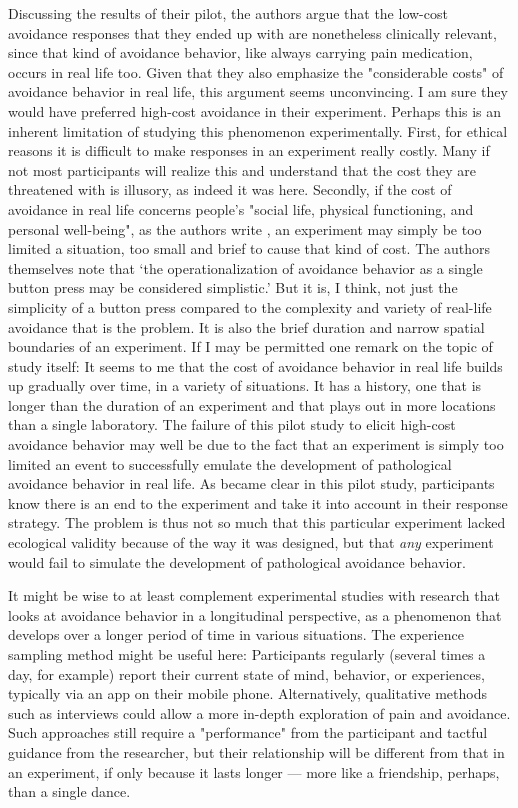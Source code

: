\documentclass[twocolumn, serif, authordate, reflection]{jote-article}
\begin{document}
Discussing the results of their pilot, the authors argue that the low-cost avoidance responses that they ended up with are nonetheless clinically relevant, since that kind of avoidance behavior, like always carrying pain medication, occurs in real life too. Given that they also emphasize the "considerable costs" \parencite[p.34]{Traxler2020} of avoidance behavior in real life, this argument seems unconvincing. I am sure they would have preferred high-cost avoidance in their experiment. Perhaps this is an inherent limitation of studying this phenomenon experimentally. First, for ethical reasons it is difficult to make responses in an experiment really costly. Many if not most participants will realize this and understand that the cost they are threatened with is illusory, as indeed it was here. Secondly, if the cost of avoidance in real life concerns people's "social life, physical functioning, and personal well-being", as the authors write \parencite[p.34]{Traxler2020}, an experiment may simply be too limited a situation, too small and brief to cause that kind of cost. The authors themselves note that `the operationalization of avoidance behavior as a single button press may be considered simplistic.' \parencite[p.34]{Traxler2020} But it is, I think, not just the simplicity of a button press compared to the complexity and variety of real-life avoidance that is the problem. It is also the brief duration and narrow spatial boundaries of an experiment. If I may be permitted one remark on the topic of study itself: It seems to me that the cost of avoidance behavior in real life builds up gradually over time, in a variety of situations. It has a history, one that is longer than the duration of an experiment and that plays out in more locations than a single laboratory. The failure of this pilot study to elicit high-cost avoidance behavior may well be due to the fact that an experiment is simply too limited an event to successfully emulate the development of pathological avoidance behavior in real life. As became clear in this pilot study, participants know there is an end to the experiment and take it into account in their response strategy. The problem is thus not so much that this particular experiment lacked ecological validity because of the way it was designed, but that \emph{any} experiment would fail to simulate the development of pathological avoidance behavior.

It might be wise to at least complement experimental studies with research that looks at avoidance behavior in a longitudinal perspective, as a phenomenon that develops over a longer period of time in various situations. The experience sampling method might be useful here: Participants regularly (several times a day, for example) report their current state of mind, behavior, or experiences, typically via an app on their mobile phone. Alternatively, qualitative methods such as interviews could allow a more in-depth exploration of pain and avoidance. Such approaches still require a "performance" from the participant and tactful guidance from the researcher, but their relationship will be different from that in an experiment, if only because it lasts longer — more like a friendship, perhaps, than a single dance.
\end{document}
